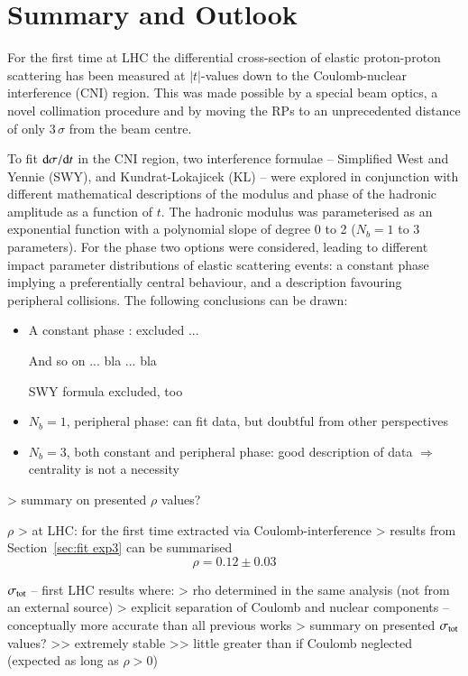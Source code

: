 \section{Summary and Outlook}
\label{sec:summary}
For the first time at LHC the differential cross-section of elastic proton-proton scattering has been measured at $|t|$-values down to the Coulomb-nuclear interference (CNI) region. This was made possible by a special beam optics, a novel collimation procedure and by moving the RPs to an unprecedented distance of only 
$3\,\sigma$ from the beam centre.

To fit ${\rm d}\sigma/{\rm d} t$ in the CNI region, two interference formulae --
Simplified West and Yennie (SWY), and Kundrat-Lokajicek (KL) -- 
were explored in 
conjunction with different mathematical descriptions of the modulus and phase 
of the hadronic amplitude as a function of $t$. The hadronic modulus was parameterised as an exponential function with a polynomial slope of degree 0 to 2 ($N_b=1$ to 3 parameters).
For the phase two options were considered, leading to different impact 
parameter distributions of elastic scattering events: a constant phase implying a preferentially central behaviour, and a description favouring peripheral collisions.
The following conclusions can be drawn:
\begin{itemize}
\item A constant phase : excluded ...

And so on ... bla ... bla 

SWY formula excluded, too
\item $N_b=1$, peripheral phase: can fit data, but doubtful from other perspectives
\item $N_b=3$, both constant and peripheral phase: good description of data $\Rightarrow$ centrality is not a necessity
\end{itemize}
\>> summary on presented $\rho$ values?

\> $\rho$
\>> at LHC: for the first time extracted via Coulomb-interference
\>> results from Section~\ref{sec:fit exp3} can be summarised
\begin{equation}
\label{eq:rho final}
\rho = 0.12 \pm 0.03
\end{equation}

\> $\sigma_{\rm tot}$ -- first LHC results where:
\>> rho determined in the same analysis (not from an external source)
\>> explicit separation of Coulomb and nuclear components -- conceptually more accurate than all previous works
\>> summary on presented $\sigma_{\rm tot}$ values?
\>>> extremely stable
\>>> little greater than if Coulomb neglected (expected as long as $\rho > 0$)


